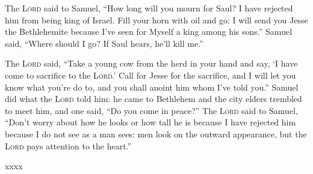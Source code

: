 
\begin{inparaenum}
     The \textsc{Lord} said to Samuel, ``How long will you mourn for Saul? I have rejected him from being king of Israel. Fill your horn with oil and go: I will send you Jesse the Bethlehemite because I've seen for Myself a king among his sons.''%
     Samuel said, ``Where should I go? If Saul hears, he'll kill me.''%
    
    The \textsc{Lord} said, ``Take\ca{\qumran\ \Hebrew{ק[ח} cf \septuagint\peshitta}{the Dead Sea Scrolls have [a letter missing], compare the Septuagint and Peshitta} a young cow from the herd in your hand and say, `I have come to sacrifice to the \textsc{Lord}.'%
     Call for Jesse for the sacrifice, and I will let you know what you're do to, and you shall anoint him whom I've told you.''%
     Samuel did what the \textsc{Lord} told him: he came to Bethlehem and the city elders trembled to meet him, and one said, ``Do you come in peace?''%
     The \textsc{Lord} said to Samuel, ``Don't worry about how he looks or how tall he is because I have rejected him because I do not see as a man sees: men look on the outward appearance, but the \textsc{Lord} pays attention to the heart.''%
    
    xxxx%
    
    
\end{inparaenum}
